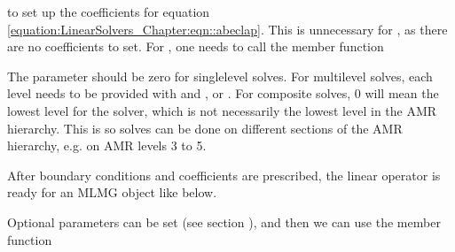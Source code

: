 \documentclass[letterpaper,10pt,english]{sphinxmanual}
\begin{document}
\sphinxAtStartPar
to set up the coefficients for equation \eqref{equation:LinearSolvers_Chapter:eqn::abeclap}. This is unnecessary for
, as there are no coefficients to set.  For ,
one needs to call the member function

\begin{sphinxVerbatim}[commandchars=\\\{\}]
      
\end{sphinxVerbatim}

\sphinxAtStartPar
The  parameter should be zero for single\sphinxhyphen{}level
solves.  For multi\sphinxhyphen{}level solves, each level needs to be provided with
 and , or .  For composite solves,  0 will
mean the lowest level for the solver, which is not necessarily the lowest
level in the AMR hierarchy. This is so solves can be done on different sections
of the AMR hierarchy, e.g. on AMR levels 3 to 5.

\sphinxAtStartPar
After boundary conditions and coefficients are prescribed, the linear
operator is ready for an MLMG object like below.

\begin{sphinxVerbatim}[commandchars=\\\{\}]
 
\end{sphinxVerbatim}

\sphinxAtStartPar
Optional parameters can be set (see section {\hyperref[\detokenize{LinearSolvers:sec-linearsolver-pars}]{}}),
and then we can use the  member function

\begin{sphinxVerbatim}[commandchars=\\\{\}]
    
               
               
\end{sphinxVerbatim}
\end{document}
